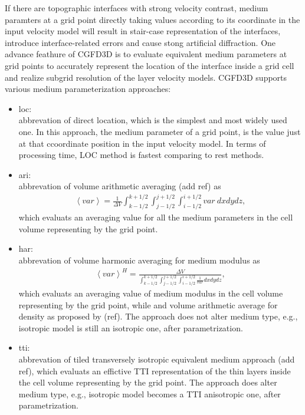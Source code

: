 If there are topographic interfaces with strong velocity contrast, 
medium paramters at a grid point directly taking values according to its coordinate in the input velocity model
 will result in stair-case representation of the interfaces, introduce interface-related errors and cause stong artificial diffraction.
One advance feathure of CGFD3D is to evaluate equivalent medium parameters at grid points 
to accurately represent the location of the interface inside a grid cell 
and realize subgrid resolution of the layer velocity models.
CGFD3D supports various medium parameterization approaches:
\begin{itemize}
\item loc: \\
  abbrevation of direct location, which is the simplest and most widely used one. 
      In this approach, the medium parameter of a grid point,
      is the value just at that ccoordinate position
      in the input velocity model. In terms of processing time,
      LOC method is fastest comparing to rest methods.
\item ari: \\
  abbrevation of volume arithmetic averaging (add ref) as
  \begin{align}
    \left<var\right> = \frac{1}{\Delta V} 
            \int_{k-1/2}^{k+1/2} \int_{j-1/2}^{j+1/2} \int_{i-1/2}^{i+1/2} var~dx dy dz,
  \end{align}
  which evaluats an averaging value for all the medium parameters
    in the cell volume representing by the grid point.
\item har: \\
  abbrevation of volume harmonic averaging for medium modulus as 
  \begin{align}
    \left<var\right>^H = \frac{\Delta V}
      {\int_{k-1/2}^{k+1/2} \int_{j-1/2}^{j+1/2} \int_{i-1/2}^{i+1/2} \frac{1}{var} dx dy dz},
  \end{align}
  which evaluats an averaging value of medium modulus in the cell volume representing by the grid point,
  while and volume arithmetic average for density as proposed by (ref).
  The approach does not alter medium type,
    e.g., isotropic model is still an isotropic one, after parametrization.
\item tti: \\
  abbrevation of tiled transversely isotropic equivalent medium approach (add ref), 
        which evaluats an effictive TTI representation of the thin layers inside the cell volume representing by the grid point.
        The approach does alter medium type, e.g., isotropic model becomes a TTI anisotropic one, after parametrization.
\end{itemize}


